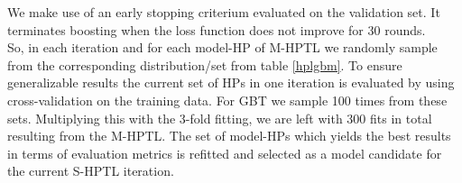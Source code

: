 \documentclass[12pt,titlepage]{article}
\begin{document}
\noindent
We make use of an early stopping criterium evaluated on the validation set. It terminates boosting when the loss function does not improve for 30 rounds. \\
So, in each iteration and for each model-HP of M-HPTL we randomly sample from the corresponding distribution/set from table \ref{hplgbm}. To ensure generalizable results the current set of HPs in one iteration is evaluated by using cross-validation on the training data. For GBT we sample 100 times from these sets. Multiplying this with the 3-fold fitting, we are left with 300 fits in total resulting from the M-HPTL. The set of model-HPs which yields the best results in terms of evaluation metrics is refitted and selected as a model candidate for the current S-HPTL iteration. \\
\end{document}
